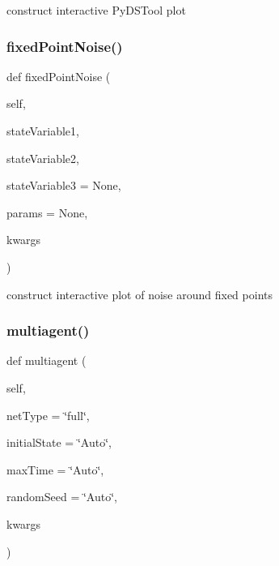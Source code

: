 construct interactive Py\+D\+S\+Tool plot 

\mbox{\label{class_mu_mo_t_1_1_mu_mo_t_1_1_mu_mo_tmodel_a3b78626249eb78091d9aad58f4a588aa}} 
\subsubsection{\texorpdfstring{fixed\+Point\+Noise()}{fixedPointNoise()}}
{\footnotesize\ttfamily def fixed\+Point\+Noise (\begin{DoxyParamCaption}\item[{}]{self,  }\item[{}]{state\+Variable1,  }\item[{}]{state\+Variable2,  }\item[{}]{state\+Variable3 = {\ttfamily None},  }\item[{}]{params = {\ttfamily None},  }\item[{}]{kwargs }\end{DoxyParamCaption})}



construct interactive plot of noise around fixed points 

\mbox{\label{class_mu_mo_t_1_1_mu_mo_t_1_1_mu_mo_tmodel_a55f7cab206306b09d38863395f186dbc}} 
\subsubsection{\texorpdfstring{multiagent()}{multiagent()}}
{\footnotesize\ttfamily def multiagent (\begin{DoxyParamCaption}\item[{}]{self,  }\item[{}]{net\+Type = {\ttfamily \char`\"{}full\char`\"{}},  }\item[{}]{initial\+State = {\ttfamily \char`\"{}Auto\char`\"{}},  }\item[{}]{max\+Time = {\ttfamily \char`\"{}Auto\char`\"{}},  }\item[{}]{random\+Seed = {\ttfamily \char`\"{}Auto\char`\"{}},  }\item[{}]{kwargs }\end{DoxyParamCaption})}

